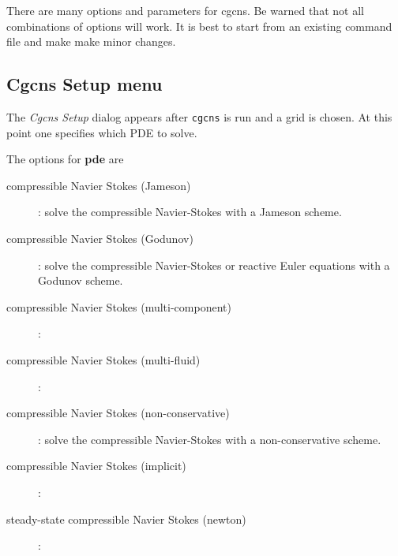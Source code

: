 \documentclass{article}
\newcommand{\solver}{cgcns}
\begin{document}
There are many options and parameters for \solver. Be warned that not all
combinations of options will work.  It is best to start from an existing command
file and make make minor changes.


\subsection{Cgcns Setup menu}\label{sec:setupDialog}

The {\em  Cgcns Setup} dialog appears after {\tt cgcns} is run and a grid is chosen.
At this point one specifies which PDE to solve.


\noindent The options for {\bf pde} are
\begin{description}
  \item[\qquad compressible Navier Stokes (Jameson)] : solve the compressible Navier-Stokes with a Jameson scheme.
  \item[\qquad compressible Navier Stokes (Godunov)] : solve the compressible Navier-Stokes or reactive Euler equations with a Godunov scheme.
  \item[\qquad compressible Navier Stokes (multi-component)] : 
  \item[\qquad compressible Navier Stokes (multi-fluid)] : 
  \item[\qquad compressible Navier Stokes (non-conservative)] : solve the compressible Navier-Stokes with a non-conservative scheme.
  \item[\qquad compressible Navier Stokes (implicit)] : 
  \item[\qquad steady-state compressible Navier Stokes (newton) ] :
\end{description}

\end{document}
